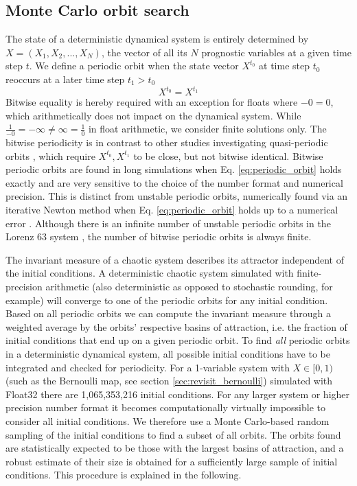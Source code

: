 \subsection{Monte Carlo orbit search}
\label{sec:orbit_search}

The state of a deterministic dynamical system is entirely determined by $X = (X_1,X_2,...,X_N)$, the vector of all its $N$
prognostic variables at a given time step $t$. We define a periodic orbit when the state vector $X^{t_0}$ at time step $t_0$
reoccurs at a later time step $t_1 > t_0$
\begin{equation}
	X^{t_0} = X^{t_1}
	\label{eq:periodic_orbit}
\end{equation}
Bitwise equality is hereby required with an exception for floats where $-0 = 0$, which arithmetically does not impact on the
dynamical system. While $\tfrac{1}{-0} = -\infty \neq \infty = \tfrac{1}{0}$ in float arithmetic, we consider finite solutions only.
The bitwise periodicity is in contrast to other studies investigating quasi-periodic orbits \citep{Urminsky2010,Yalniz2021},
which require $X^{t_0}, X^{t_1}$ to be close, but not bitwise identical. Bitwise periodic orbits are found in long simulations
when Eq. \ref{eq:periodic_orbit} holds exactly and are very sensitive to the choice of the number format and numerical
precision. This is distinct from unstable periodic orbits, numerically found via an iterative Newton method when
Eq. \ref{eq:periodic_orbit} holds up to a numerical error \citep{Viswanath2007}. Although there is an infinite number of unstable
periodic orbits in the Lorenz 63 system \citep{Capinski2018,Lorenz1963}, the number of bitwise periodic orbits is always finite.

The invariant measure of a chaotic system describes its attractor independent of the initial conditions. A deterministic chaotic
system simulated with finite-precision arithmetic (also deterministic as opposed to stochastic rounding, for example) will converge
to one of the periodic orbits for any initial condition. Based on all periodic orbits we can compute the invariant measure through
a weighted average by the orbits’ respective basins of attraction, i.e. the fraction of initial conditions that end up on a given
periodic orbit. To find \emph{all} periodic orbits in a deterministic dynamical system, all possible initial conditions have to be
integrated and checked for periodicity. For a 1-variable system with $X \in [0,1)$ (such as the Bernoulli map, see section
\ref{sec:revisit_bernoulli}) simulated with Float32 there are 1,065,353,216 initial conditions. For any larger system or
higher precision number format it becomes computationally virtually impossible to consider all initial conditions. We therefore
use a Monte Carlo-based random sampling of the initial conditions to find a subset of all orbits. The orbits found are statistically
expected to be those with the largest basins of attraction, and a robust estimate of their size is obtained for a sufficiently large
sample of initial conditions. This procedure is explained in the following.

